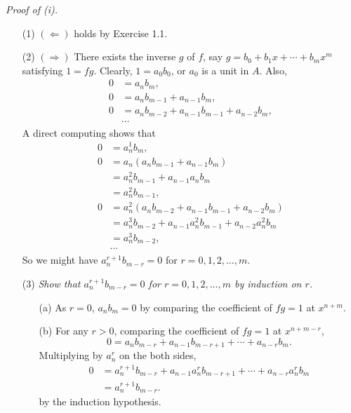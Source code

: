 \documentclass{article}
\begin{document}
\emph{Proof of (i).}
\begin{enumerate}
\item[(1)]
  $(\Longleftarrow)$ holds by Exercise 1.1.

\item[(2)]
  $(\Longrightarrow)$
  There exists the inverse $g$ of $f$, say $g = b_0 + b_1 x + \cdots + b_m x^m$
  satisfying
  $1 = fg$.
  Clearly, $1 = a_0 b_0$, or $a_0$ is a unit in $A$.
  Also,
  \begin{align*}
    0
    &= a_n b_m, \\
    0
    &= a_n b_{m-1} + a_{n-1} b_m, \\
    0
    &= a_n b_{m-2} + a_{n-1} b_{m-1} + a_{n-2} b_m, \\
    & \cdots
  \end{align*}
  A direct computing shows that
  \begin{align*}
    0
    &= a_n^{1} b_m, \\
    0
    &= a_n (a_n b_{m-1} + a_{n-1} b_m) \\
    &= a_n^{2} b_{m-1} + a_{n-1} a_n b_m \\
    &= a_n^{2} b_{m-1}, \\
    0
    &= a_n^{2} (a_n b_{m-2} + a_{n-1} b_{m-1} + a_{n-2} b_m) \\
    &= a_n^{3} b_{m-2} + a_{n-1} a_n^{2} b_{m-1} + a_{n-2} a_n^{2} b_m \\
    &= a_n^{3} b_{m-2}, \\
    & \cdots
  \end{align*}
  So we might have $a_n^{r+1} b_{m-r} = 0$ for $r = 0, 1, 2, \ldots, m$.

\item[(3)]
  \emph{Show that $a_n^{r+1} b_{m-r} = 0$ for $r = 0, 1, 2, \ldots, m$
  by induction on $r$.}
  \begin{enumerate}
  \item[(a)]
    As $r = 0$, $a_n b_m = 0$ by comparing the coefficient of $fg = 1$ at $x^{n+m}$.
  
  \item[(b)]
    For any $r > 0$, comparing the coefficient of $fg = 1$ at $x^{n+m-r}$,
    \[
      0 = a_n b_{m-r} + a_{n-1} b_{m-r+1} + \cdots + a_{n-r} b_m.
    \]
    Multiplying by $a_n^r$ on the both sides,
    \begin{align*}
      0
      &= a_n^{r+1} b_{m-r} + a_{n-1} a_n^{r} b_{m-r+1} + \cdots + a_{n-r} a_n^{r} b_m \\
      &= a_n^{r+1} b_{m-r}.
    \end{align*}
    by the induction hypothesis.
  \end{enumerate}


\end{enumerate}
\end{document}
